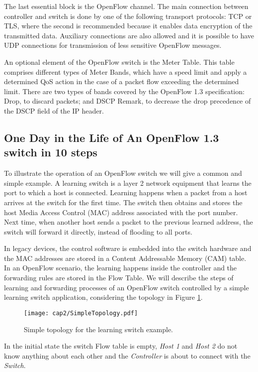 The last essential block is the OpenFlow channel. The main connection between controller and switch is done by one of the following transport protocols: TCP or TLS, where the second is recommended because it enables data encryption of the transmitted data. Auxiliary connections are also allowed and it is possible to have UDP connections for transmission of less sensitive OpenFlow messages.

An optional element of the OpenFlow switch is the Meter Table. This table comprises different types of Meter Bands, which have a speed limit and apply a determined QoS action in the case of a packet flow exceeding the determined limit. There are two types of bands covered by the OpenFlow 1.3 specification: Drop, to discard packets; and DSCP Remark, to decrease the drop precedence of the DSCP field of the IP header.

\subsection{One Day in the Life of An OpenFlow 1.3 switch in 10 steps}

To illustrate the operation of an OpenFlow switch we will give a common and simple example. A learning switch is a layer 2 network equipment that learns the port to which a host is connected. Learning happens when a packet from a host arrives at the switch for the first time. The switch then obtains and stores the host Media Access Control (MAC) address associated with the port number. Next time, when another host sends a packet to the previous learned address, the switch will forward it directly, instead of flooding to all ports. 

In legacy devices, the control software is embedded into the switch hardware and the MAC addresses are stored in a Content Addressable Memory (CAM) table. In an OpenFlow scenario, the learning happens inside the controller and the forwarding rules are stored in the Flow Table. We will describe the steps of learning and forwarding processes of an OpenFlow switch controlled by a simple learning switch application, considering the topology in Figure \ref{fig:simpletopo}. 

\begin{figure}[h!]
\centering
\texttt{[image: cap2/SimpleTopology.pdf]}
\caption{Simple topology for the learning switch example.}
\label{fig:simpletopo}
\end{figure}

In the initial state the switch Flow table is empty, \textit{Host 1} and \textit{Host 2} do not know anything about each other and the  \textit{Controller} is about to connect with the \textit{Switch}. 

